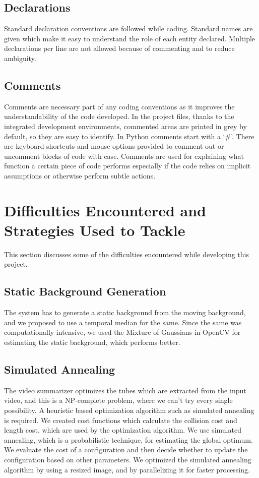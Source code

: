     \subsection{Declarations}

    Standard declaration conventions are followed while coding. Standard names are given which make it easy to understand the role of each entity declared. Multiple declarations per line are not allowed because of commenting and to reduce ambiguity.

    \subsection{Comments}
    Comments are necessary part of any coding conventions as it improves the understandability of the code developed. In the project files, thanks to the integrated development environments, commented areas are printed in grey by default, so they are easy to identify.
    In Python comments start with a ‘\#’. There are keyboard shortcuts and mouse options provided to comment out or uncomment blocks of code with ease. Comments are used for explaining what function a certain piece of code performs especially if the code relies on implicit assumptions or otherwise perform subtle actions.

\section{Difficulties Encountered and Strategies Used to Tackle}
This section discusses some of the difficulties encountered while developing this project.

    \subsection{Static Background Generation}
    The system has to generate a static background from the moving background, and we proposed to use a temporal median for the same. Since the same was computationally intensive, we used the Mixture of Gaussians in OpenCV for estimating the static background, which performs better.

    \subsection{Simulated Annealing}
    The video summarizer optimizes the tubes which are extracted from the input video, and this is a NP-complete problem, where we can’t try every single possibility. A heuristic based optimization algorithm such as simulated annealing is required. We created cost functions which calculate the collision cost and length cost, which are used by the optimization algorithm. We use simulated annealing, which is a probabilistic technique, for estimating the global optimum. We evaluate the cost of a configuration and then decide whether to update the configuration based on other parameters. We optimized the simulated annealing algorithm by using a resized image, and by parallelizing it for faster processing.

